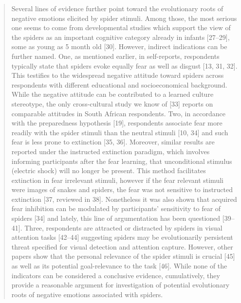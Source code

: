 \documentclass[
]{book}
\begin{document}
\begin{quote}
Several lines of evidence further point toward the evolutionary roots of negative emotions elicited by spider stimuli. Among those, the most serious one seems to come from developmental studies which support the view of the spiders as an important cognitive category already in infants {[}27--29{]}, some as young as 5 month old {[}30{]}. However, indirect indications can be further named. One, as mentioned earlier, in self-reports, respondents typically state that spiders evoke equally fear as well as disgust {[}13, 31, 32{]}. This testifies to the widespread negative attitude toward spiders across respondents with different educational and socioeconomical background. While the negative attitude can be contributed to a learned culture stereotype, the only cross-cultural study we know of {[}33{]} reports on comparable attitudes in South African respondents. Two, in accordance with the preparedness hypothesis {[}19{]}, respondents associate fear more readily with the spider stimuli than the neutral stimuli {[}10, 34{]} and such fear is less prone to extinction {[}35, 36{]}. Moreover, similar results are reported under the instructed extinction paradigm, which involves informing participants after the fear learning, that unconditional stimulus (electric shock) will no longer be present. This method facilitates extinction in fear irrelevant stimuli, however if the fear relevant stimuli were images of snakes and spiders, the fear was not sensitive to instructed extinction {[}37, reviewed in 38{]}. Nonetheless it was also shown that acquired fear inhibition can be modulated by participants' sensitivity to fear of spiders {[}34{]} and lately, this line of argumentation has been questioned {[}39--41{]}. Three, respondents are attracted or distracted by spiders in visual attention tasks {[}42--44{]} suggesting spiders may be evolutionarily persistent threat specified for visual detection and attention capture. However, other papers show that the personal relevance of the spider stimuli is crucial {[}45{]} as well as its potential goal-relevance to the task {[}46{]}. While none of the indicators can be considered a conclusive evidence, cumulatively, they provide a reasonable argument for investigation of potential evolutionary roots of negative emotions associated with spiders.
\end{quote}
\end{document}
